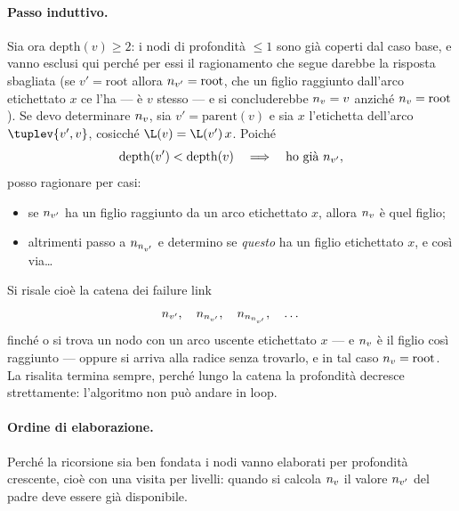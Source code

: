 \paragraph{Passo induttivo.}
Sia ora $\mathrm{depth}(v) \ge 2$: i nodi di profondità $\le 1$ sono già coperti dal caso
base, e vanno esclusi qui perché per essi il ragionamento che segue darebbe la risposta
sbagliata (se $v' = \mathrm{root}$ allora $n_{v'} = \mathrm{root}$, che un figlio raggiunto
dall'arco etichettato $x$ ce l'ha --- è $v$ stesso --- e si concluderebbe $n_{v} = v$
anziché $n_{v} = \mathrm{root}$).
Se devo determinare $n_{v}$, sia $v' = \mathrm{parent}(v)$ e sia $x$ l'etichetta dell'arco
$\tuplev{v', v}$, cosicché $\L(v) = \L(v')\,x$. Poiché
\[
  \mathrm{depth}(v') < \mathrm{depth}(v)
  \quad\Longrightarrow\quad
  \text{ho già } n_{v'},
\]
posso ragionare per casi:
\begin{itemize}
  \item se $n_{v'}$ ha un figlio raggiunto da un arco etichettato $x$, allora $n_{v}$ è
        quel figlio;
  \item altrimenti passo a $n_{n_{v'}}$ e determino se \emph{questo} ha un figlio
        etichettato $x$, e così via\dots
\end{itemize}
Si risale cioè la catena dei failure link
\[
  n_{v'},\quad n_{n_{v'}},\quad n_{n_{n_{v'}}},\quad \dots
\]
finché o si trova un nodo con un arco uscente etichettato $x$ --- e $n_{v}$ è il figlio così
raggiunto --- oppure si arriva alla radice senza trovarlo, e in tal caso
$n_{v} = \mathrm{root}$. La risalita termina sempre, perché lungo la catena la profondità
decresce strettamente: l'algoritmo non può andare in loop.

\paragraph{Ordine di elaborazione.}
Perché la ricorsione sia ben fondata i nodi vanno elaborati per profondità crescente, cioè
con una visita per livelli: quando si calcola $n_{v}$ il valore $n_{v'}$ del padre deve
essere già disponibile.

